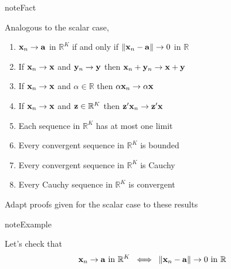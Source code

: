 \documentclass[letterpaper,10pt,english]{jupyterBook}
\begin{document}
\begin{sphinxadmonition}{note}{Fact}

\sphinxAtStartPar
Analogous to the scalar case,
\begin{enumerate}
%
\item {} 
\sphinxAtStartPar
\({\bf x}_n \to {\bf a}\) in \(\mathbb{R}^K\) if and only if \(\|{\bf x}_n -
{\bf a}\| \to 0\) in \(\mathbb{R}\)

\item {} 
\sphinxAtStartPar
If \({\bf x}_n \to {\bf x}\) and \({\bf y}_n \to {\bf y}\) then \({\bf x}_n +
{\bf y}_n \to {\bf x} +  {\bf y}\)

\item {} 
\sphinxAtStartPar
If \({\bf x}_n \to {\bf x}\) and \(\alpha \in \mathbb{R}\) then \(\alpha {\bf x}_n 
\to \alpha {\bf x}\)

\item {} 
\sphinxAtStartPar
If \({\bf x}_n \to {\bf x}\) and \({\bf z} \in \mathbb{R}^K\) then \({\bf z}' {\bf x}_n 
\to {\bf z}' {\bf x}\)

\item {} 
\sphinxAtStartPar
Each sequence in \(\mathbb{R}^K\) has at most one limit

\item {} 
\sphinxAtStartPar
Every convergent sequence in \(\mathbb{R}^K\) is bounded

\item {} 
\sphinxAtStartPar
Every convergent sequence in \(\mathbb{R}^K\) is Cauchy

\item {} 
\sphinxAtStartPar
Every Cauchy sequence in \(\mathbb{R}^K\) is convergent

\end{enumerate}
\end{sphinxadmonition}

\sphinxAtStartPar
{} Adapt proofs given for the scalar case to these results

\begin{sphinxadmonition}{note}{Example}

\sphinxAtStartPar
Let’s check that
\begin{equation*}
\begin{split}
{\bf x}_n \to {\bf a} \text{ in } \mathbb{R}^K
\; \iff \;
\|{\bf x}_n - {\bf a}\| \to 0 \text{ in } \mathbb{R}
\end{split}
\end{equation*}\end{sphinxadmonition}
\end{document}
